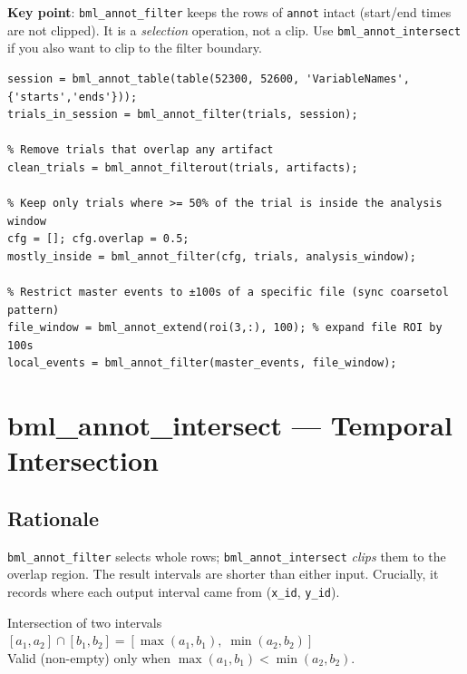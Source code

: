\documentclass[11pt, a4paper]{article}
\begin{document}
\textbf{Key point}: \texttt{bml\_annot\_filter} keeps the rows of \texttt{annot} intact (start/end times are not clipped). It is a \emph{selection} operation, not a clip. Use \texttt{bml\_annot\_intersect} if you also want to clip to the filter boundary.

\begin{lstlisting}[style=matlab]
% Keep only trials within the session window
session = bml_annot_table(table(52300, 52600, 'VariableNames',{'starts','ends'}));
trials_in_session = bml_annot_filter(trials, session);

% Remove trials that overlap any artifact
clean_trials = bml_annot_filterout(trials, artifacts);

% Keep only trials where >= 50% of the trial is inside the analysis window
cfg = []; cfg.overlap = 0.5;
mostly_inside = bml_annot_filter(cfg, trials, analysis_window);

% Restrict master events to ±100s of a specific file (sync coarsetol pattern)
file_window = bml_annot_extend(roi(3,:), 100); % expand file ROI by 100s
local_events = bml_annot_filter(master_events, file_window);
\end{lstlisting}

\section{bml\_annot\_intersect --- Temporal Intersection}
\label{sec:intersect}

\subsection{Rationale}

\texttt{bml\_annot\_filter} selects whole rows; \texttt{bml\_annot\_intersect} \emph{clips} them to the overlap region. The result intervals are shorter than either input. Crucially, it records where each output interval came from (\texttt{x\_id}, \texttt{y\_id}).

\begin{formulabox}{Intersection of two intervals}
$[a_1,a_2] \cap [b_1,b_2] = [\max(a_1,b_1),\;\min(a_2,b_2)]$\\[3pt]
Valid (non-empty) only when $\max(a_1,b_1) < \min(a_2,b_2)$.
\end{formulabox}
\end{document}
